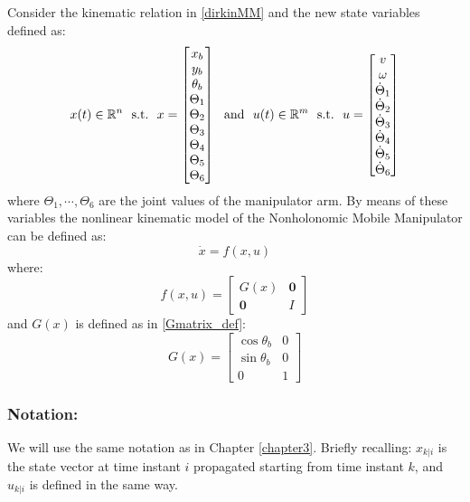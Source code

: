 Consider the kinematic relation in \ref{dirkinMM} and the new state variables defined as:
\begin{equation}
{x}(t) \in \mathbb{R}^n\ \  \textnormal{s.t.}\ \  {x}  = \left[ \begin{matrix} x_b \\ y_b \\ \theta_b \\ \Theta_1 \\ \Theta_2 \\ \Theta_3 \\ \Theta_4 \\ \Theta_5 \\ \Theta_6 \end{matrix} \right]\ \   \textnormal{and}\ \  {u}(t) \in \mathbb{R}^m\ \ \textnormal{s.t.}\ \ {u}=\left[ \begin{matrix} v \\ \omega \\ \dot{\Theta}_1 \\ \dot{\Theta}_2 \\ \dot{\Theta}_3 \\ \dot{\Theta}_4 \\ \dot{\Theta}_5 \\ \dot{\Theta}_6 \end{matrix} \right]
\end{equation}
where $\Theta_1, \cdots,\Theta_6$ are the joint values of the manipulator arm.
By means of these variables the nonlinear kinematic model of the Nonholonomic Mobile Manipulator can be defined as:
\begin{equation} \label{system_base}
	\dot{{x}}=f({x},{u})
\end{equation} 
where:
\begin{equation} \label{NLsystem}
	f({x},{u}) = \left[ \begin{matrix}
	G({x}) & \textbf{0} \\ \textbf{0} & I \end{matrix} \right]
\end{equation}
and $G(x)$ is defined as in \ref{Gmatrix_def}:
\begin{equation*}
G({x}) =  \left[
\begin{matrix}
\cos\theta_b & 0 \\
\sin\theta_b & 0 \\
0 & 1 
\end{matrix}
\right] 
\end{equation*}

\subsubsection*{Notation:}
We will use the same notation as in Chapter \ref{chapter3}. Briefly recalling: ${x}_{k|i}$ is the state vector at time instant $i$ propagated starting from time instant $k$, and ${u}_{k|i}$ is defined in the same way.

